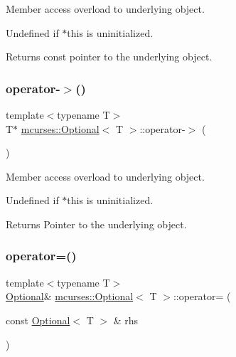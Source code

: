 Member access overload to underlying object. 

Undefined if $\ast$this is uninitialized. \begin{DoxyReturn}{Returns}
const pointer to the underlying object. 
\end{DoxyReturn}
\hypertarget{classmcurses_1_1Optional_a64ff247dad4e237f9e16c073174ba6be}{}\label{classmcurses_1_1Optional_a64ff247dad4e237f9e16c073174ba6be} 
\subsubsection{\texorpdfstring{operator-\/$>$()}{operator->()}\hspace{0.1cm}{\footnotesize\ttfamily [2/2]}}
{\footnotesize\ttfamily template$<$typename T$>$ \\
T$\ast$ \hyperlink{classmcurses_1_1Optional}{mcurses\+::\+Optional}$<$ T $>$\+::operator-\/$>$ (\begin{DoxyParamCaption}{ }\end{DoxyParamCaption})\hspace{0.3cm}{\ttfamily [inline]}}



Member access overload to underlying object. 

Undefined if $\ast$this is uninitialized. \begin{DoxyReturn}{Returns}
Pointer to the underlying object. 
\end{DoxyReturn}
\hypertarget{classmcurses_1_1Optional_ab76004970466959aaa1ae03255db9bf3}{}\label{classmcurses_1_1Optional_ab76004970466959aaa1ae03255db9bf3} 
\subsubsection{\texorpdfstring{operator=()}{operator=()}\hspace{0.1cm}{\footnotesize\ttfamily [1/7]}}
{\footnotesize\ttfamily template$<$typename T$>$ \\
\hyperlink{classmcurses_1_1Optional}{Optional}\& \hyperlink{classmcurses_1_1Optional}{mcurses\+::\+Optional}$<$ T $>$\+::operator= (\begin{DoxyParamCaption}\item[{const \hyperlink{classmcurses_1_1Optional}{Optional}$<$ T $>$ \&}]{rhs }\end{DoxyParamCaption})\hspace{0.3cm}{\ttfamily [inline]}}



